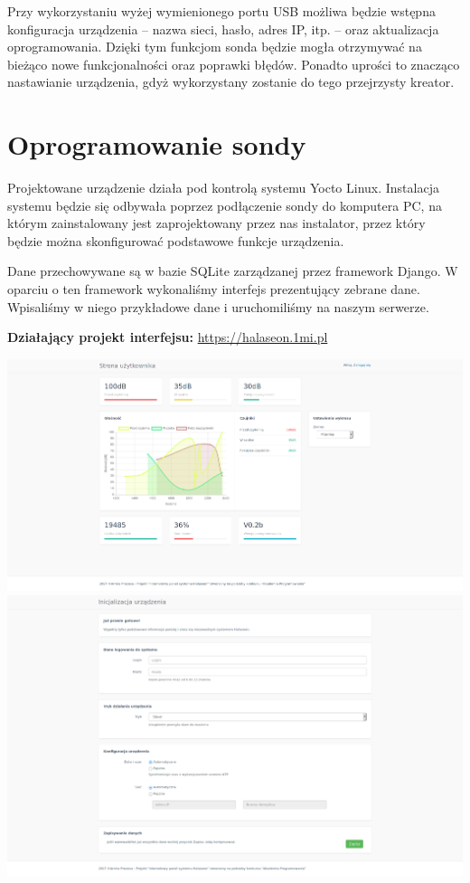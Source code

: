 \documentclass[12pt, a4paper]{article}
\begin{document}
Przy wykorzystaniu wyżej wymienionego portu USB możliwa będzie wstępna konfiguracja urządzenia -- nazwa sieci, hasło, adres IP, itp. -- oraz aktualizacja oprogramowania. Dzięki tym funkcjom sonda będzie mogła otrzymywać na bieżąco nowe funkcjonalności oraz poprawki błędów. Ponadto uprości to znacząco nastawianie urządzenia, gdyż wykorzystany zostanie do tego przejrzysty kreator.

\section{Oprogramowanie sondy}

Projektowane urządzenie działa pod kontrolą systemu Yocto Linux. Instalacja systemu będzie się odbywała poprzez podłączenie sondy do komputera PC, na którym zainstalowany jest zaprojektowany przez nas instalator, przez który będzie można skonfigurować podstawowe funkcje urządzenia.

Dane przechowywane są w bazie SQLite zarządzanej przez framework Django. W oparciu o ten framework wykonaliśmy interfejs prezentujący zebrane dane. Wpisaliśmy w niego przykładowe dane i uruchomiliśmy na naszym serwerze.

\textbf{Działający projekt interfejsu:} \url{https://halaseon.1mi.pl}

\includegraphics[width=\textwidth]{web_page1.png}
\includegraphics[width=\textwidth]{web_page2.png}
\end{document}
